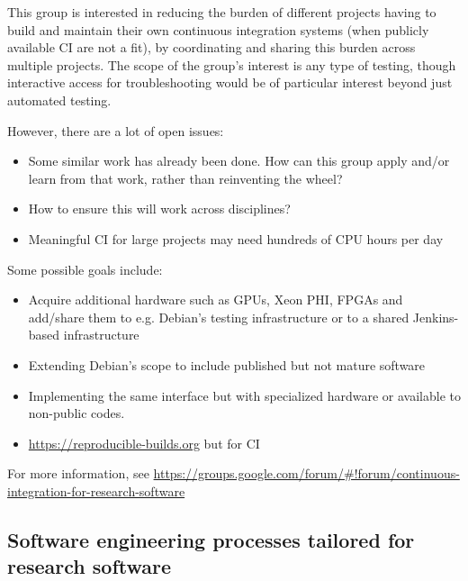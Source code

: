 \documentclass[11pt, oneside]{amsart}
\newcommand{\note}[1]{ {\textcolor{blueish}    { ***Note:      #1 }}}
\begin{document}
This group is interested in reducing the burden of different projects having to build and maintain their own continuous integration systems (when publicly available CI are not a fit), by coordinating and sharing this burden across multiple projects.
%
The scope of the group's interest is any type of testing, though interactive access for troubleshooting would be of particular interest beyond just automated testing.

However, there are a lot of open issues:
\begin{itemize}
\item Some similar work has already been done.  How can this group apply and/or learn from that work, rather than reinventing the wheel?
\item How to ensure this will work across disciplines?
\item Meaningful CI for large projects may need hundreds of CPU hours per day
\end{itemize}

Some possible goals include:
\begin{itemize}
\item Acquire additional hardware such as GPUs, Xeon PHI, FPGAs and add/share them to e.g. Debian's testing infrastructure or to a shared Jenkins-based infrastructure
\item Extending Debian's scope to include published but not mature software
\item Implementing the same interface but with specialized hardware or available to non-public codes.
\item \url{https://reproducible-builds.org} but for CI
\end{itemize}

For more information, see \url{https://groups.google.com/forum/#!forum/continuous-integration-for-research-software}




\subsection{Software engineering processes tailored for research software}
\label{sec:soft-eng}

\end{document}
